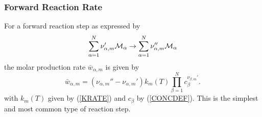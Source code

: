 \documentclass[dvips]{article}
\begin{document}
\subsubsection{Forward Reaction Rate}
For a forward reaction step as expressed by
\begin{equation}
\sum_{\alpha=1}^{N}\nu_{\alpha,m}'{\cal M}_{\alpha} \rightarrow
\sum_{\alpha=1}^{N}\nu_{\alpha,m}''{\cal M}_{\alpha}
\end{equation}
the molar production rate $\bar{w}_{\alpha,m}$ is given by
\begin{equation}
\bar{w}_{\alpha,m} = 
\left(\nu_{\alpha,m}''-\nu_{\alpha,m}'\right)k_{m}(T)
\prod_{\beta=1}^{N}c_{\beta}^{\nu_{\beta,m}'}.
\label{REACSTEP}
\end{equation}
with $k_{m}(T)$ given by (\ref{KRATE}) and $c_{\beta}$ by (\ref{CONCDEF}).
This is the simplest and most common type of reaction step.
\end{document}
